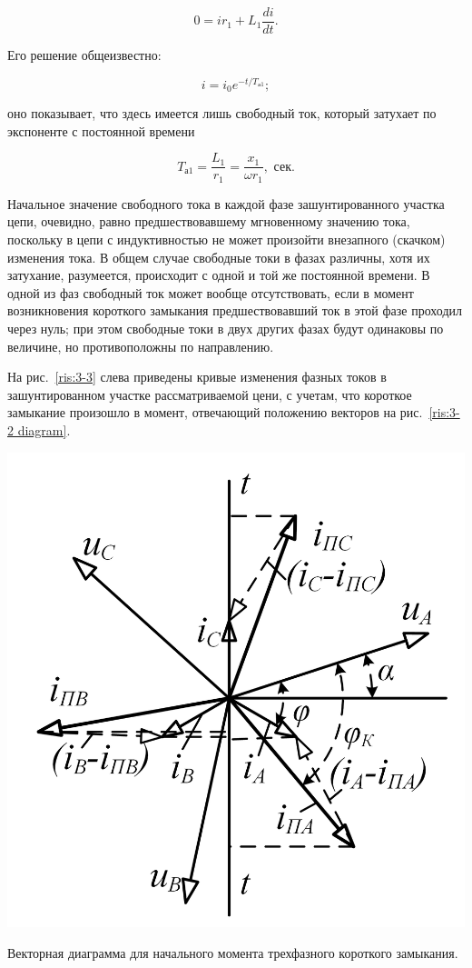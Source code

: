 \begin{equation}
	0 = ir_1 + L_1 \frac{di}{dt}.
	\label{eq:3-1 diff_ur}
\end{equation}

Его решение общеизвестно:

\begin{equation}
	i = i_0 e^{-t / T_{\text{а}1}}; %
	\label{eq:3-2 diff_solve}
\end{equation}

оно показывает, что здесь имеется лишь свободный ток, который затухает по экспоненте с постоянной времени

\begin{equation}
	T_{\text{а}1} = \frac{L_1}{r_1} = \frac{x_1}{\omega r_1}, \textit{~сек}.
	\label{eq:3-3 T_a1}
\end{equation}

Начальное значение свободного тока в каждой фазе зашунтированного участка цепи, очевидно, равно предшествовавшему мгновенному значению тока, поскольку в цепи с индуктивностью не может произойти внезапного (скачком) изменения тока. В общем случае свободные токи в фазах различны, хотя их затухание, разумеется, происходит с одной и той же постоянной времени. В одной из фаз свободный ток может вообще отсутствовать, если в момент возникновения короткого замыкания предшествовавший ток в этой фазе проходил через нуль; при этом свободные токи в двух других фазах будут одинаковы по величине, но противоположны по направлению.

На рис.~\ref{ris:3-3} слева приведены кривые изменения фазных токов в зашунтированном участке рассматриваемой цени, с учетам, что короткое замыкание произошло в момент, отвечающий положению векторов на рис.~\ref{ris:3-2 diagram}.

\begin{floatingfigure}[lflt]{0.45\linewidth}
	\centering
	\includegraphics[width=0.40\linewidth]{pic/3-2}
	\caption{Векторная диаграмма для начального момента трехфазного короткого замыкания.}
	\label{ris:3-2 diagram}
\end{floatingfigure}

